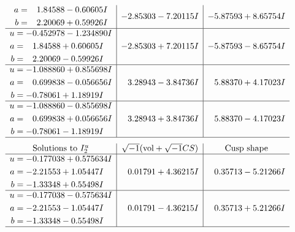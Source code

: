 \documentclass[1p]{elsarticle_modified}
\theoremstyle{definition}
\newcommand{\I}{\sqrt{-1}}
\begin{document}
$$\begin{array}{c|c|c}
\begin{aligned}
a &= \phantom{-}1.84588 - 0.60605 I \\
b &= \phantom{-}2.20069 + 0.59926 I\end{aligned}
 & -2.85303 - 7.20115 I & -5.87593 + 8.65754 I \\ \hline\begin{aligned}
u &= -0.452978 - 1.234890 I \\
a &= \phantom{-}1.84588 + 0.60605 I \\
b &= \phantom{-}2.20069 - 0.59926 I\end{aligned}
 & -2.85303 + 7.20115 I & -5.87593 - 8.65754 I \\ \hline\begin{aligned}
u &= -1.088860 + 0.855698 I \\
a &= \phantom{-}0.699838 - 0.056656 I \\
b &= -0.78061 + 1.18919 I\end{aligned}
 & \phantom{-}3.28943 - 3.84736 I & \phantom{-}5.88370 + 4.17023 I \\ \hline\begin{aligned}
u &= -1.088860 - 0.855698 I \\
a &= \phantom{-}0.699838 + 0.056656 I \\
b &= -0.78061 - 1.18919 I\end{aligned}
 & \phantom{-}3.28943 + 3.84736 I & \phantom{-}5.88370 - 4.17023 I\\
 \hline 
 \end{array}$$\newpage$$\begin{array}{c|c|c}  
\text{Solutions to }I^u_{2}& \I (\text{vol} + \sqrt{-1}CS) & \text{Cusp shape}\\
 \hline 
\begin{aligned}
u &= -0.177038 + 0.575634 I \\
a &= -2.21553 + 1.05447 I \\
b &= -1.33348 + 0.55498 I\end{aligned}
 & \phantom{-}0.01791 + 4.36215 I & \phantom{-}0.35713 - 5.21266 I \\ \hline\begin{aligned}
u &= -0.177038 - 0.575634 I \\
a &= -2.21553 - 1.05447 I \\
b &= -1.33348 - 0.55498 I\end{aligned}
 & \phantom{-}0.01791 - 4.36215 I & \phantom{-}0.35713 + 5.21266 I\\
 \hline 
 \end{array}$$\newpage
\newpage\renewcommand{\arraystretch}{1}
\end{document}
